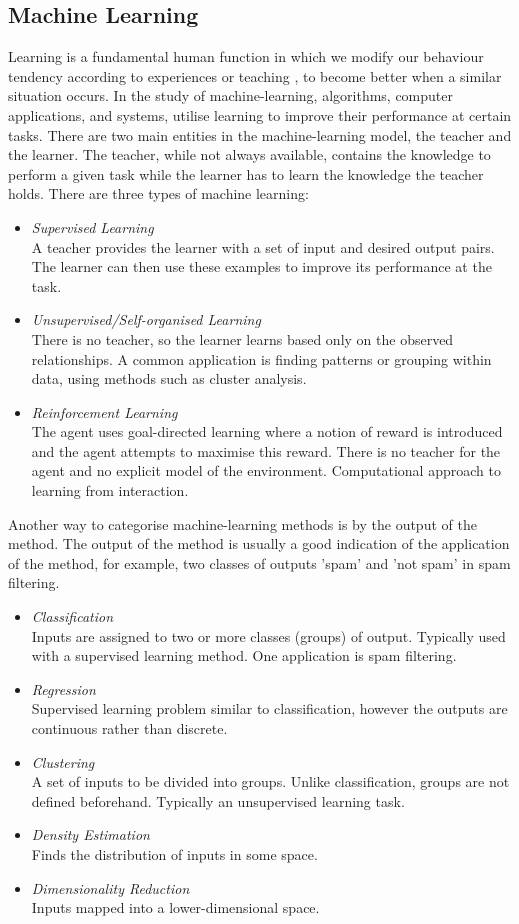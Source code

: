 \documentclass[12pt,a4paper]{article}
\begin{document}
\subsection{Machine Learning}
Learning is a fundamental human function in which we modify our behaviour tendency according to experiences or teaching \cite{michalski}, to become better when a similar situation occurs. In the study of machine-learning, algorithms, computer applications, and systems, utilise learning to improve their performance at certain tasks. There are two main entities in the machine-learning model, the teacher and the learner. The teacher, while not always available, contains the knowledge to perform a given task while the learner has to learn the knowledge the teacher holds. \cite{swarmann} There are three types of machine learning:
\begin{itemize}
\item \emph{Supervised Learning}\\
A teacher provides the learner with a set of input and desired output pairs. The learner can then use these examples to improve its performance at the task.
\item \emph{Unsupervised/Self-organised Learning}\\
There is no teacher, so the learner learns based only on the observed relationships. A common application is finding patterns or grouping within data, using methods such as cluster analysis.
\item \emph{Reinforcement Learning}\\
The agent uses goal-directed learning where a notion of reward is introduced and the agent attempts to maximise this reward. There is no teacher for the agent and no explicit model of the environment. Computational approach to learning from interaction. \cite{reinforce}
\end{itemize}
\newpage
Another way to categorise machine-learning methods is by the output of the method. The output of the method is usually a good indication of the application of the method, for example, two classes of outputs 'spam' and 'not spam' in spam filtering. 
\begin{itemize}
\item \emph{Classification}\\
Inputs are assigned to two or more classes (groups) of output. Typically used with a supervised learning method. One application is spam filtering.
\item \emph{Regression}\\
Supervised learning problem similar to classification, however the outputs are continuous rather than discrete.
\item \emph{Clustering}\\
A set of inputs to be divided into groups. Unlike classification, groups are not defined beforehand. Typically an unsupervised learning task.
\item \emph{Density Estimation}\\
Finds the distribution of inputs in some space.
\item \emph{Dimensionality Reduction}\\
Inputs mapped into a lower-dimensional space.\\
\end{itemize}
\end{document}
